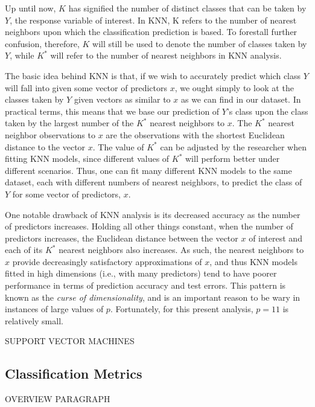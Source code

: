 \documentclass[12pt]{article}
\begin{document}
Up until now, $K$ has signified the number of distinct classes that can be taken by $Y$, 
the response variable of interest.  In KNN, K refers to the number of nearest neighbors 
upon which the classification prediction is based.  To forestall further confusion, 
therefore, $K$ will still be used to denote the number of classes taken by $Y$, while 
$K ^ *$ will refer to the number of nearest neighbors in KNN analysis.  

The basic idea behind KNN is that, if we wish to accurately predict which class $Y$ will 
fall into given some vector of predictors $x$, we ought simply to look at the classes 
taken by $Y$ given vectors as similar to $x$ as we can find in our dataset.  In practical 
terms, this means that we base our prediction of $Y$'s class upon the class taken by the 
largest number of the $K ^ *$ nearest neighbors to $x$.  The $K ^ *$ nearest neighbor 
observations to $x$ are the observations with the shortest Euclidean distance to the 
vector $x$.  The value of $K ^ *$ can be adjusted by the researcher when fitting KNN 
models, since different values of $K ^ *$ will perform better under different scenarios.  
Thus, one can fit many different KNN models to the same dataset, each with different 
numbers of nearest neighbors, to predict the class of $Y$ for some vector of predictors, 
$x$.  

One notable drawback of KNN analysis is its decreased accuracy as the number of 
predictors increases.  Holding all other things constant, when the number of predictors 
increases, the Euclidean distance between the vector $x$ of interest and each of its 
$K ^ *$ nearest neighbors also increases.  As such, the nearest neighbors to $x$ provide 
decreasingly satisfactory approximations of $x$, and thus KNN models fitted in high 
dimensions (i.e., with many predictors) tend to have poorer performance in terms of 
prediction accuracy and test errors.  This pattern is known as the 
\textit{curse of dimensionality}, and is an important reason to be wary in instances of 
large values of $p$.  Fortunately, for this present analysis, $p = 11$ is relatively 
small. 

SUPPORT VECTOR MACHINES

\subsection{Classification Metrics}
\label{sec:metr}

OVERVIEW PARAGRAPH
\end{document}
